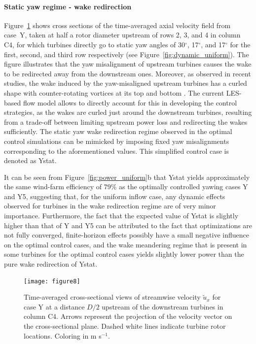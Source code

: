 \documentclass[energies,article,submit,moreauthors,latex,10pt,a4paper]{mdpi}
\begin{document}
\paragraph{Static yaw regime - wake redirection}
\noindent Figure~\ref{fig:cross_section} shows cross sections of the time-averaged axial velocity field from case~Y, taken at half a rotor diameter upstream of rows 2, 3, and 4 in column C4, for which turbines directly go to static yaw angles of 30$^\circ$, 17$^\circ$, and 17$^\circ$ for the first, second, and third row respectively (see Figure~\ref{fig:dynamic_uniform}). The figure illustrates that the yaw misalignment of upstream turbines causes the wake to be redirected away from the downstream ones. Moreover, as observed in recent studies, the wake induced by the yaw-misaligned upstream turbines has a curled shape with counter-rotating vortices at its top and bottom \cite{howland2016wake,bastankhah2016experimental}. The current LES-based flow model allows to directly account for this in developing the control strategies, as the wakes are curled just around the downstream turbines, resulting from a trade-off between limiting upstream power loss and redirecting the wakes sufficiently. The static yaw wake redirection regime observed in the optimal control simulations can be mimicked by imposing fixed yaw misalignments corresponding to the aforementioned values. This simplified control case is denoted as Ystat. 

It can be seen from Figure~\ref{fig:power_uniform}b that Ystat yields approximately the same wind-farm efficiency of 79\% as the optimally controlled yawing cases Y and Y5, suggesting that, for the uniform inflow case, any dynamic effects observed for turbines in the wake redirection regime are of very minor importance. Furthermore, the fact that the expected value of Ystat is slightly higher than that of Y and Y5 can be attributed to the fact that optimizations are not fully converged, finite-horizon effects possibly have a small negative influence on the optimal control cases, and the wake meandering regime that is present in some turbines for the optimal control cases yields slightly lower power than the pure wake redirection of Ystat.

\begin{figure}
	\texttt{[image: figure8]}
	\caption{Time-averaged cross-sectional views of streamwise velocity $\widetilde{u}_x$ for case Y at a distance $D/2$ upstream of the downstream turbines in column C4. Arrows represent the projection of the velocity vector on the cross-sectional plane. Dashed white lines indicate turbine rotor locations. Coloring in m s$^{-1}$. \label{fig:cross_section}}
\end{figure}
\end{document}
